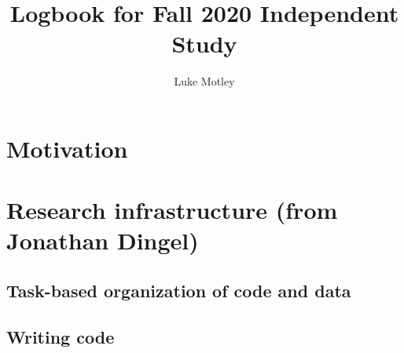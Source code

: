 \documentclass{report}
\title{Logbook for Fall 2020 Independent Study}
\author{
Luke Motley
}
\date{}
\numberwithin{equation}{section}
\numberwithin{figure}{section}
\numberwithin{table}{section}
\begin{document}
\maketitle

\renewcommand{\thechapter}{\Alph{chapter}}
\setcounter{tocdepth}{2}
\tableofcontents
\etocsettocstyle{}{} %

\chapter{Motivation}
   
   
%
%
%
%
%
%



\chapter{Research infrastructure (from Jonathan Dingel)}


\section{Task-based organization of code and data} 
\section{Writing code} 
\end{document}

